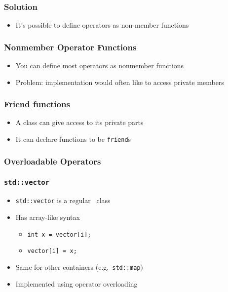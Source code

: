 \documentclass{../ucll-slides}
\begin{document}
\begin{frame}
  \frametitle{Solution}
  \begin{itemize}
    \item It's possible to define operators as non-member functions
  \end{itemize}
\end{frame}

\begin{frame}
  \frametitle{Nonmember Operator Functions}
  \begin{itemize}
    \item You can define most operators as nonmember functions
    \item Problem: implementation would often like to access private members
  \end{itemize}
\end{frame}

\begin{frame}
  \frametitle{Friend functions}
  \begin{itemize}
    \item A class can give access to its private parts
    \item It can declare functions to be {\tt friend}s
  \end{itemize}
\end{frame}

\begin{frame}
  \frametitle{Overloadable Operators}
  \begin{center}
  \end{center}
\end{frame}

\begin{frame}
  \frametitle{\tt std::vector}
  \begin{itemize}
    \item {\tt std::vector} is a regular \cpp\ class
    \item Has array-like syntax
      \begin{itemize}
        \item {\tt int x = vector[i];}
        \item {\tt vector[i] = x;}
      \end{itemize}
    \item Same for other containers (e.g.\ {\tt std::map})
    \item Implemented using operator overloading
  \end{itemize}
\end{frame}
\end{document}
